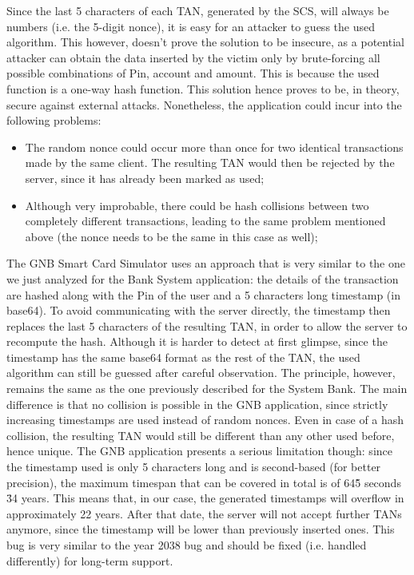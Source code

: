Since the last 5 characters of each TAN, generated by the SCS, will always be numbers (i.e. the 5-digit nonce), it is easy for an attacker to guess the used algorithm. This however, doesn't prove the solution to be insecure, as a potential attacker can obtain the data inserted by the victim only by brute-forcing all possible combinations of Pin, account and amount. This is because the used function is a one-way hash function.\newline
This solution hence proves to be, in theory, secure against external attacks. Nonetheless, the application could incur into the following problems:
\begin{itemize}
	\item The random nonce could occur more than once for two identical transactions made by the same client. The resulting TAN would then be rejected by the server, since it has already been marked as used;
	\item Although very improbable, there could be hash collisions between two completely different transactions, leading to the same problem mentioned above (the nonce needs to be the same in this case as well);
\end{itemize}
The GNB Smart Card Simulator uses an approach that is very similar to the one we just analyzed for the Bank System application: the details of the transaction are hashed along with the Pin of the user and a 5 characters long timestamp (in base64). To avoid communicating with the server directly, the timestamp then replaces the last 5 characters of the resulting TAN, in order to allow the server to recompute the hash. Although it is harder to detect at first glimpse, since the timestamp has the same base64 format as the rest of the TAN, the used algorithm can still be guessed after careful observation. The principle, however, remains the same as the one previously described for the System Bank. The main difference is that no collision is possible in the GNB application, since strictly increasing timestamps are used instead of random nonces. Even in case of a hash collision, the resulting TAN would still be different than any other used before, hence unique.\newline
The GNB application presents a serious limitation though: since the timestamp used is only 5 characters long and is second-based (for better precision), the maximum timespan that can be covered in total is of 64\^5 seconds \= 34 years. This means that, in our case, the generated timestamps will overflow in approximately 22 years. After that date, the server will not accept further TANs anymore, since the timestamp will be lower than previously inserted ones. This bug is very similar to the year 2038 bug and should be fixed (i.e. handled differently) for long-term support.

